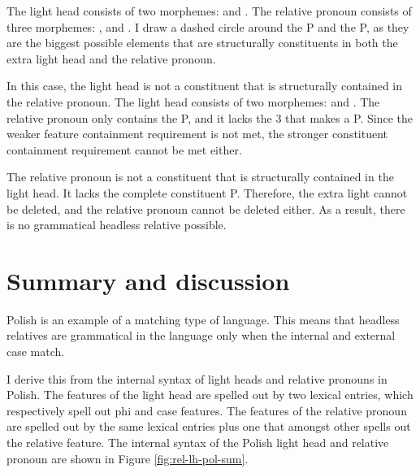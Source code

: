 The light head consists of two morphemes:  and .
The relative pronoun consists of three morphemes: ,  and .
I draw a dashed circle around the P and the P, as they are the biggest possible elements that are structurally constituents in both the extra light head and the relative pronoun.

In this case, the light head is not a constituent that is structurally contained in the relative pronoun.
The light head consists of two morphemes:  and .
The relative pronoun only contains the P, and it lacks the 3 that makes a P. Since the weaker feature containment requirement is not met, the stronger constituent containment requirement cannot be met either.

The relative pronoun is not a constituent that is structurally contained in the light head. It lacks the complete constituent P.
Therefore, the extra light cannot be deleted, and the relative pronoun cannot be deleted either.
As a result, there is no grammatical headless relative possible.

\section{Summary and discussion}

Polish is an example of a matching type of language. This means that headless relatives are grammatical in the language only when the internal and external case match.

I derive this from the internal syntax of light heads and relative pronouns in Polish. The features of the light head are spelled out by two lexical entries, which respectively spell out phi and case features. The features of the relative pronoun are spelled out by the same lexical entries plus one that amongst other spells out the relative feature. The internal syntax of the Polish light head and relative pronoun are shown in Figure \ref{fig:rel-lh-pol-sum}.

